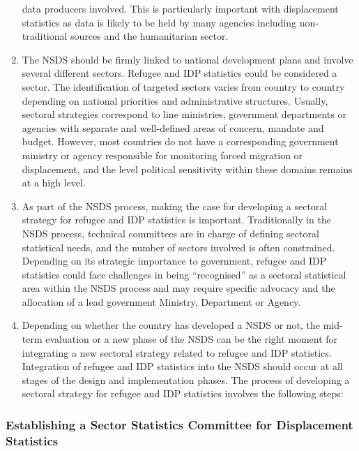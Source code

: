 \documentclass[
]{article}
\begin{document}
\begin{enumerate}
  data producers involved. This is particularly important with
  displacement statistics as data is likely to be held by many
  agencies including non-traditional sources and the humanitarian
  sector.
\item
  The NSDS should be firmly linked to national development plans and
  involve several different sectors. Refugee and IDP statistics could
  be considered a sector. The identification of targeted sectors
  varies from country to country depending on national priorities and
  administrative structures. Usually, sectoral strategies correspond
  to line ministries, government departments or agencies with separate
  and well-defined areas of concern, mandate and budget. However, most
  countries do not have a corresponding government ministry or agency
  responsible for monitoring forced migration or displacement, and the
  level political sensitivity within these domains remains at a high
  level.
\item
  As part of the NSDS process, making the case for developing a
  sectoral strategy for refugee and IDP statistics is important.
  Traditionally in the NSDS process, technical committees are in
  charge of defining sectoral statistical needs, and the number of
  sectors involved is often constrained. Depending on its strategic
  importance to government, refugee and IDP statistics could face
  challenges in being ``recognised'' as a sectoral statistical area
  within the NSDS process and may require specific advocacy and the
  allocation of a lead government Ministry, Department or Agency.
\item
  Depending on whether the country has developed a NSDS or not, the
  mid-term evaluation or a new phase of the NSDS can be the right
  moment for integrating a new sectoral strategy related to refugee
  and IDP statistics. Integration of refugee and IDP statistics into
  the NSDS should occur at all stages of the design and implementation
  phases. The process of developing a sectoral strategy for refugee
  and IDP statistics involves the following steps:
\end{enumerate}

\hypertarget{establishing-a-sector-statistics-committee-for-displacement-statistics}{%
\subsubsection{Establishing a Sector Statistics Committee for Displacement Statistics}\label{establishing-a-sector-statistics-committee-for-displacement-statistics}}
\end{document}
